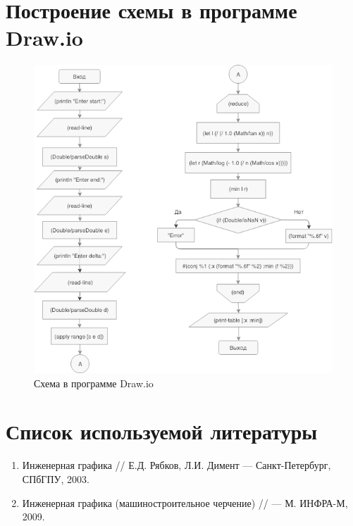 \documentclass[a4paper,14pt,russian]{report}
\begin{document}
\section{Построение схемы в программе Draw.io}

\begin{figure}[!htb]
  \centerline{\includegraphics[width=1\textwidth]{draw}}
  \caption{Схема в программе Draw.io}
\end{figure}

\section{Список используемой литературы}

\begin{enumerate}
  \item Инженерная графика // Е.Д. Рябков, Л.И. Димент — Санкт-Петербург, СПбГПУ, 2003.
  \item Инженерная графика (машиностроительное черчение) // — М. ИНФРА-М, 2009.
\end{enumerate}
\end{document}
